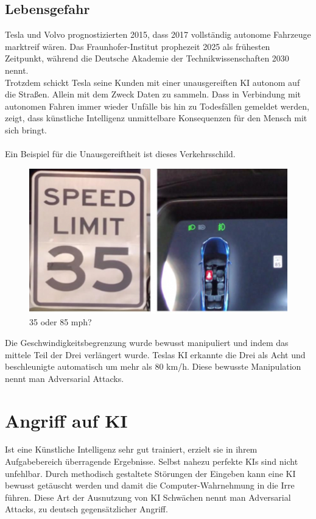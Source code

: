 \documentclass[12pt,oneside,a4paper,parskip]{scrbook}
\begin{document}
\subsection{Lebensgefahr}
Tesla und Volvo prognostizierten 2015, dass 2017 vollständig autonome Fahrzeuge marktreif wären. Das Fraunhofer-Institut prophezeit 2025 als frühesten Zeitpunkt, während die Deutsche Akademie der Technikwissenschaften 2030 nennt. %
\\Trotzdem schickt Tesla seine Kunden mit einer unausgereiften KI autonom auf die Straßen. Allein mit dem Zweck Daten zu sammeln. Dass in Verbindung mit autonomen Fahren immer wieder Unfälle bis hin zu Todesfällen gemeldet werden, zeigt, dass künstliche Intelligenz unmittelbare Konsequenzen für den Mensch mit sich bringt. \\\\
Ein Beispiel für die Unausgereiftheit ist dieses Verkehrsschild. %
\begin{figure}[h]
	\begin{center}
		\includegraphics[width=15cm]{Bilder/Tesla_Adversarial_Attack.png}
		\caption{35 oder 85 mph?}
		\label{fig:Verkehrsschild}
	\end{center}
\end{figure}
Die Geschwindigkeitsbegrenzung wurde bewusst manipuliert und indem das mittele Teil der Drei verlängert wurde. Teslas KI erkannte die Drei als Acht und beschleunigte automatisch um mehr als 80 km/h. Diese bewusste Manipulation nennt man Adversarial Attacks.
\section{Angriff auf KI}
Ist eine Künstliche Intelligenz sehr gut trainiert, erzielt sie in ihrem Aufgabebereich überragende Ergebnisse. Selbst nahezu perfekte KIs sind nicht unfehlbar. Durch methodisch gestaltete Störungen der Eingeben kann eine KI bewusst getäuscht werden und damit die Computer-Wahrnehmung in die Irre führen. Diese Art der Ausnutzung von KI Schwächen nennt man Adversarial Attacks, zu deutsch gegensätzlicher Angriff.
\end{document}

